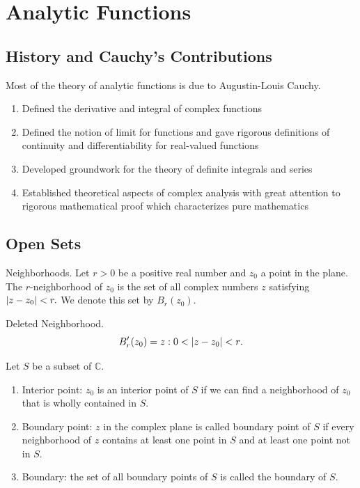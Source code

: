 \documentclass[11pt,reqno,oneside,a4paper]{article}
\begin{document}


\section{Analytic Functions}

\subsection{History and Cauchy's Contributions}
Most of the theory of analytic functions is due to Augustin-Louis Cauchy.
\begin{enumerate}
	\item Defined the derivative and integral of complex functions
	\item Defined the notion of limit for functions and gave rigorous definitions of continuity and differentiability for real-valued functions
	\item Developed groundwork for the theory of definite integrals and series 
	\item Established theoretical aspects of complex analysis with great attention to rigorous mathematical proof which characterizes pure mathematics
\end{enumerate}

\subsection{Open Sets}
\begin{defn}{Neighborhoods.}
Let $r>0$ be a positive real number and $z_0$ a point in the plane. The $r$-neighborhood of $z_0$ is the set of all complex numbers $z$ satisfying $\left\lvert z-z_0\right\rvert < r.$ We denote this set by $B_r(z_0).$
\end{defn}

\begin{defn}{Deleted Neighborhood.}
$$B'_r(z_0) = {z: 0 < \left\lvert z-z_0\right\rvert < r}.$$
\end{defn}

\begin{defn}
Let $S$ be a subset of $\mathbb{C}$.  
\begin{enumerate}
	\item Interior point: $z_0$ is an interior point of $S$ if we can find a neighborhood of $z_0$ that is wholly contained in $S$.
	\item Boundary point: $z$ in the complex plane is called boundary point of $S$ if every neighborhood of $z$ contains at least one point in $S$ and at least one point not in $S$. 
	\item Boundary: the set of all boundary points of $S$ is called the boundary of $S$.
\end{enumerate}
\end{defn}
\end{document}
